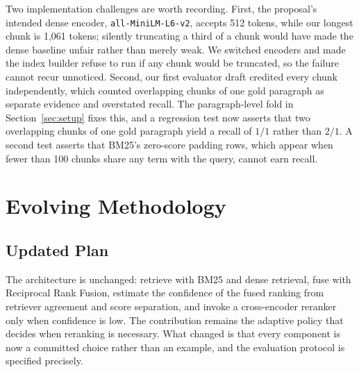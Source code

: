 \documentclass[sigconf,nonacm]{acmart}
\begin{document}
Two implementation challenges are worth recording. First, the proposal's
intended dense encoder, \texttt{all-MiniLM-L6-v2}, accepts 512 tokens, while our
longest chunk is 1{,}061 tokens; silently truncating a third of a chunk would
have made the dense baseline unfair rather than merely weak. We switched encoders
and made the index builder refuse to run if any chunk would be truncated, so the
failure cannot recur unnoticed. Second, our first evaluator draft credited every
chunk independently, which counted overlapping chunks of one gold paragraph as
separate evidence and overstated recall. The paragraph-level fold in
Section~\ref{sec:setup} fixes this, and a regression test now asserts that two
overlapping chunks of one gold paragraph yield a recall of $1/1$ rather than
$2/1$. A second test asserts that BM25's zero-score padding rows, which appear
when fewer than 100 chunks share any term with the query, cannot earn recall.

\section{Evolving Methodology}

\subsection{Updated Plan}

The architecture is unchanged: retrieve with BM25 and dense retrieval, fuse with
Reciprocal Rank Fusion, estimate the confidence of the fused ranking from
retriever agreement and score separation, and invoke a cross-encoder reranker
only when confidence is low. The contribution remains the adaptive policy that
decides when reranking is necessary. What changed is that every component is now
a committed choice rather than an example, and the evaluation protocol is
specified precisely.
\end{document}
